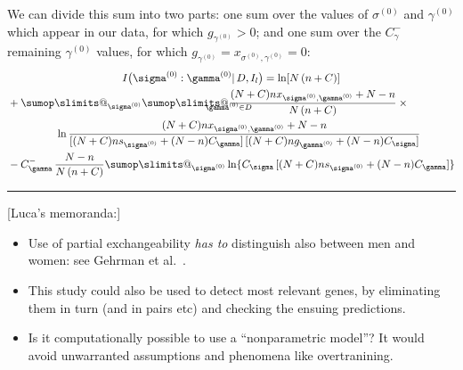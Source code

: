 \documentclass[\ifafour a4paper,12pt,\else a5paper,10pt,\fi%
onecolumn,oneside,article,%
british%
]{memoir}
\makeatletter
\theoremstyle{remark}
\theoremstyle{innote}
\def\sum{\DOTSI\sumop\slimits@}
\newcommand*{\citey}{\parencites*}
\DeclarePairedDelimiter\set{\{}{\}}
\renewcommand*{\|}{\mathpunct{|}}
\newcommand*{\etal}{{et al.}}
\newcommand*{\dob}{degree of belief}
\newcommand*{\yD}{D}
\newcommand*{\mI}{I}
\newcommand*{\ys}{\sigma}
\newcommand*{\yg}{\gamma}
\newcommand*{\gn}{l}
\newcommand*{\ysi}[1]{\ys^{(#1)}}
\newcommand*{\ygi}[1]{\yg^{(#1)}}
\newcommand*{\yso}{\ysi{0}}
\newcommand*{\ygo}{\ygi{0}}
\newcommand*{\yCs}{C_{\sigma}}
\newcommand*{\yCg}{C_{\gamma}}
\newcommand*{\yIc}{I_{\gn}}
\newcommand*{\yCgn}{\yCg^{-}}
\makeatother
\begin{document}
We can divide this sum into two parts: one sum over the values of $\yso$
and $\ygo$ which appear in our data, for which $g_{\ygo}>0$; and one sum
over the $\yCgn$ remaining $\ygo$ values,  for which $g_{\ygo}=x_{\yso,\ygo}=0$:
\begin{multline}
  \label{eq:pre_mutual_info_final_three}
  \mI\bigl( \yso : \ygo \| \yD,\yIc \bigr) =
  \ln[N\,(n+C)] \\
  \begin{aligned}[b]
  &+
    \!\begin{multlined}[t][0.92\linewidth]
\sum_{\yso}
\sum_{\mathclap{\ygo \in \yD}}
  \frac{(N+C) n x_{\yso, \ygo}+N-n}{N\,(n+C)}\times{}\\
  \ln\frac{(N+C) n x_{\yso, \ygo}+N-n}{
    [(N+C) n s_{\yso}+(N-n)\yCg]\,
    [(N+C) n g_{\ygo}+(N-n)\yCs]
  } 
\end{multlined}
    \\
    &-\yCgn\,
      \frac{N-n}{N\,(n+C)}\sum_{\yso}\ln\{\yCs\,[(N+C) n s_{\yso}+(N-n)\yCg]\}
  \end{aligned}
\end{multline}

\bigskip
\hrule
[Luca's memoranda:]
\begin{itemize}
\item Use of partial exchangeability \emph{has to} distinguish also between
  men and women: see Gehrman \etal\ \citey[p.~327]{gehrmanetal2013}.
\item This study could also be used to detect most relevant genes, by
  eliminating them in turn (and in pairs etc) and checking the ensuing
  predictions.
\item Is it computationally possible to use a \enquote{nonparametric
    model}? It would avoid unwarranted assumptions and phenomena like
  overtranining.
\end{itemize}
\end{document}
